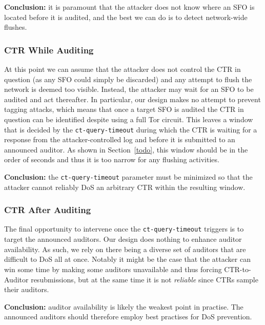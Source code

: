 \textbf{Conclusion:}
it is paramount that the attacker does not know where an SFO is located before
it is audited, and the best we can do is to detect network-wide flushes.

\subsubsection{CTR While Auditing}
At this point we can assume that the attacker does not control the CTR in
question (as any SFO could simply be discarded) and any attempt to flush the
network is deemed too visible.  Instead, the attacker may wait for an
SFO to be audited and act thereafter.  In particular, our design makes no
attempt to prevent tagging attacks, which means that once a target SFO is
audited the CTR in question can be identified despite using a full Tor circuit.
This leaves a window that is decided by the \texttt{ct-query-timeout} during
which the CTR is waiting for a response from the attacker-controlled log and
before it is submitted to an announced auditor.  As shown in Section~\ref{todo},
this window should be in the order of seconds and thus it is too narrow for any
flushing activities.

\textbf{Conclusion:}
the \texttt{ct-query-timeout} parameter must be minimized so that the attacker
cannot reliably DoS an arbitrary CTR within the resulting window.

\subsubsection{CTR After Auditing}
The final opportunity to intervene once the \texttt{ct-query-timeout} triggers
is to target the announced auditors.  Our design does nothing to enhance
auditor availability.  As such, we rely on there being a diverse set of
auditors that are difficult to DoS all at once.  Notably it might be the case
that the attacker can win some time by making some auditors unavailable and thus
forcing CTR-to-Auditor resubmissions, but at the same time it is not
\emph{reliable} since CTRs sample their auditors.

\textbf{Conclusion:}
auditor availability is likely the weakest point in practise.  The
announced auditors should therefore employ best practises for DoS prevention.
